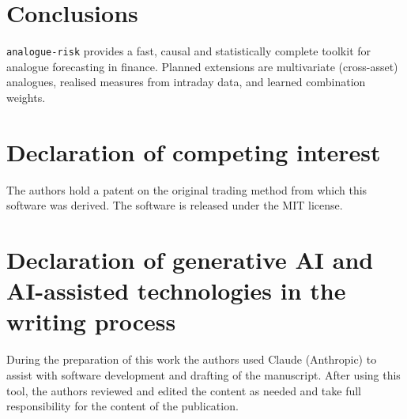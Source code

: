 \documentclass[preprint,12pt]{elsarticle}
\begin{document}
\section{Conclusions}

\texttt{analogue-risk} provides a fast, causal and statistically complete toolkit for analogue
forecasting in finance. Planned extensions are multivariate (cross-asset) analogues, realised
measures from intraday data, and learned combination weights.

\section*{Declaration of competing interest}
The authors hold a patent on the original trading method from which this software was derived.
The software is released under the MIT license.

\section*{Declaration of generative AI and AI-assisted technologies in the writing process}
During the preparation of this work the authors used Claude (Anthropic) to assist with software
development and drafting of the manuscript. After using this tool, the authors reviewed and
edited the content as needed and take full responsibility for the content of the publication.



\end{document}
